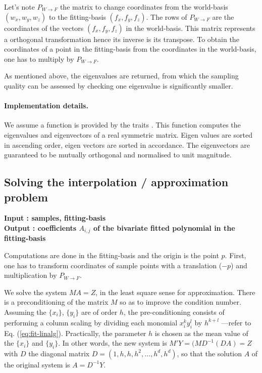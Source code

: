 Let's note $P_{W\rightarrow F}$ the matrix to change coordinates from the
world-basis $(w_x,w_y,w_z)$ to the fitting-basis $(f_x,f_y,f_z)$. The
rows of $P_{W\rightarrow F}$ are the coordinates of the vectors
$(f_x,f_y,f_z)$ in the world-basis. This matrix represents a
orthogonal transformation hence its inverse is its transpose. To obtain
the coordinates of a point in the fitting-basis from the coordinates
in the world-basis, one has to multiply by $ P_{W\rightarrow F}$.

As mentioned above, the eigenvalues are returned, from which the
sampling quality can be assessed by checking one eigenvalue is
significantly smaller.


\paragraph{Implementation details.}
We assume a  function is provided by the traits
.
This function computes the eigenvalues and eigenvectors of a real
symmetric matrix. Eigen values are sorted in ascending order, eigen
vectors are sorted in accordance.  The eigenvectors are guaranteed to
be mutually orthogonal and normalised to unit magnitude.

\subsection{Solving the interpolation / approximation problem}
\label{sec:solving}

{\bf Input : samples, fitting-basis \\ Output : coefficients $A_{i,j}$ of the
bivariate fitted polynomial in the fitting-basis }

Computations are done in the fitting-basis and the origin is the point
$p$. First, one has to transform coordinates of sample points with a
translation ($-p$) and multiplication by $ P_{W\rightarrow F}$.


We solve the system $MA=Z$, in the least square sense for
approximation. There is a preconditioning of the matrix $M$ so as to
improve the condition number. Assuming the $\{x_i\}$, $\{y_i\}$ are of
order $h$, the pre-conditioning consists of performing a column
scaling by dividing each monomial $x_i^ky_i^l$ by $h^{k+l}$ ---refer
to Eq. (\ref{eq:fit-linalg}). Practically, the parameter $h$ is chosen
as the mean value of the $\{x_i\}$ and $\{y_i\}$. In other words, the
new system is $M'Y=(MD^{-1}(DA)=Z$ with $D$ the diagonal matrix
$D=(1,h,h,h^2,\ldots,h^d,h^d)$, so that the solution $A$ of the
original system is $A=D^{-1}Y$.

